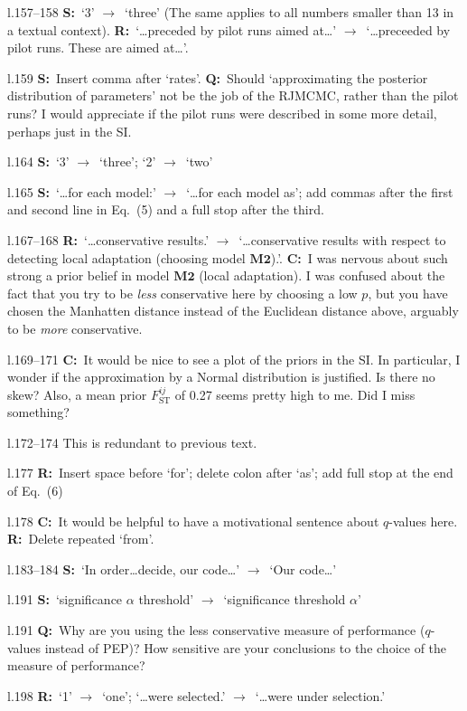 \documentclass[11pt]{article}
\newenvironment{my_description}
{\begin{description}
  \setlength{\itemsep}{2pt}
  \setlength{\parskip}{0pt}
  \setlength{\parsep}{0pt}}
{\end{description}}
\newcommand{\ra}{$\rightarrow$\ }
\newcommand{\C}{\textbf{C:}\ }
\newcommand{\Q}{\textbf{Q:}\ }
\newcommand{\R}{\textbf{R:}\ }
\newcommand{\V}{\textbf{S:}\ }
\begin{document}
\begin{my_description}
	\item [l.157--158] \V `3' \ra `three' (The same applies to all numbers smaller than 13 in a textual context). \R `\dots preceded by pilot runs aimed at\dots' \ra `\dots preceeded by pilot runs. These are aimed at\dots'.
	\item [l.159] \V Insert comma after `rates'. \Q Should `approximating the posterior distribution of parameters' not be the job of the RJMCMC, rather than the pilot runs? I would appreciate if the pilot runs were described in some more detail, perhaps just in the SI.
	\item [l.164] \V `3' \ra `three'; `2' \ra `two'
	\item [l.165] \V `\dots for each model:' \ra `\dots for each model as'; add commas after the first and second line in Eq.\ (5) and a full stop after the third.
	\item [l.167--168] \R `\dots conservative results.' \ra `\dots conservative results with respect to detecting local adaptation (choosing model $\mathbf{M2}$).'. \C I was nervous about such strong a prior belief in model $\mathbf{M2}$ (local adaptation). I was confused about the fact that you try to be \emph{less} conservative here by choosing a low $p$, but you have chosen the Manhatten distance instead of the Euclidean distance above, arguably to be \emph{more} conservative.
	\item [l.169--171] \C It would be nice to see a plot of the priors in the SI. In particular, I wonder if the approximation by a Normal distribution is justified. Is there no skew? Also, a mean prior $F^{ij}_{\mathrm{ST}}$ of 0.27 seems pretty high to me. Did I miss something?
	\item [l.172--174] This is redundant to previous text.
	\item [l.177] \R Insert space before `for'; delete colon after `as'; add full stop at the end of Eq.\ (6)
	\item [l.178] \C It would be helpful to have a motivational sentence about $q$-values here. \R Delete repeated `from'.
	\item [l.183--184] \V `In order\dots decide, our code\dots' \ra `Our code\dots'
	\item [l.191] \V `significance $\alpha$ threshold' \ra `significance threshold $\alpha$'
	\item [l.191] \Q Why are you using the less conservative measure of performance ($q$-values instead of PEP)? How sensitive are your conclusions to the choice of the measure of performance?
	\item [l.198] \R `1' \ra `one'; `\dots were selected.' \ra `\dots were under selection.'

\end{my_description}
\end{document}
